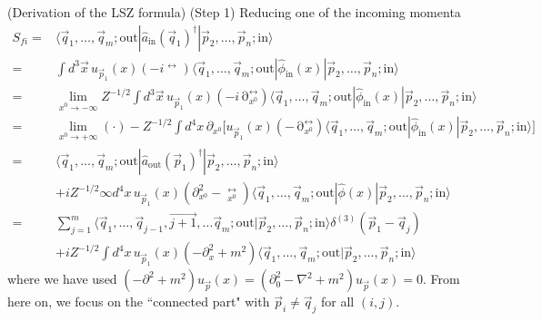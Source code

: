 \begin{thm}
(Derivation of the LSZ formula) (Step 1) Reducing one of the incoming momenta 
\[\begin{align*}
S_{fi}=&\langle \vec{q}_{1},\ldots ,\vec{q}_{m};\mathrm{out}|\hat{a}_{\mathrm{in}}(\vec{q}_{1})^{\dagger }|\vec{p}_{2},\ldots ,\vec{p}_{n};\mathrm{in}\rangle \\
=&\int d^3\vec{x}\,u_{\vec{p}_{1}}(x)(-i\mathop{\partial _{x^{0}}}^{\leftrightarrow })\langle \vec{q}_{1},\ldots ,\vec{q}_{m};\mathrm{out}|\hat{\phi }_{\mathrm{in}}(x)|\vec{p}_{2},\ldots ,\vec{p}_{n};\mathrm{in}\rangle \\
=&\lim _{x^{0}\rightarrow -\infty }Z^{-1/2}\int d^3\vec{x}\,u_{\vec{p}_{1}}(x)(-i\mathop{\partial }^{\leftrightarrow }_{x^{0}})\langle \vec{q}_{1},\ldots ,\vec{q}_{m};\mathrm{out}|\hat{\phi }_{\mathrm{in}}(x)|\vec{p}_{2},\ldots ,\vec{p}_{n};\mathrm{in}\rangle \\
=&\lim _{x^{0}\rightarrow +\infty }(\cdot )-Z^{-1/2}\int d^4x\,\partial _{x^{0}}\Big[u_{\vec{p}_{1}}(x)(-\mathop{\partial }^{\leftrightarrow }_{x^{0}})\langle \vec{q}_{1},\ldots ,\vec{q}_{m};\mathrm{out}|\hat{\phi }_{\mathrm{in}}(x)|\vec{p}_{2},\ldots ,\vec{p}_{n};\mathrm{in}\rangle  \Big]\\
=&\langle \vec{q}_{1},\ldots ,\vec{q}_{m};\mathrm{out}|\hat{a}_{\mathrm{out}}(\vec{p}_{1})^{\dagger }|\vec{p}_{2},\ldots ,\vec{p}_{n};\mathrm{in}\rangle \\
&+iZ^{-1/2}\infty d^{4}x\,u_{\vec{p}_{1}}(x)(\partial ^2_{x^{0}}-\mathop{\partial^2 }^{\leftrightarrow }_{x^{0}})\langle \vec{q}_{1},\ldots ,\vec{q}_{m};\mathrm{out}|\hat{\phi }(x)|\vec{p}_{2},\ldots ,\vec{p}_{n};\mathrm{in}\rangle \\
=&\sum ^{m}_{j=1}\langle \vec{q}_{1},\ldots ,\vec{q}_{j-1},\vec{j+1},\ldots \vec{q}_{m};\mathrm{out}|\vec{p}_{2},\ldots ,\vec{p}_{n};\mathrm{in}\rangle \delta ^{(3)}(\vec{p}_1-\vec{q}_{j})\\
&+iZ^{-1/2}\int d^{4}x\,u_{\vec{p}_{1}}(x)(-\partial _{x}^2+m^2)\langle \vec{q}_{1},\ldots ,\vec{q}_{m};\mathrm{out}|\vec{p}_{2},\ldots ,\vec{p}_{n};\mathrm{in}\rangle
\end{align*}\]
where we have used $(-\partial ^2+m^2)u_{\vec{p}}(x)=(\partial _{0}^2-\nabla ^2+m^2)u_{\vec{p}}(x)=0$. From here on, we focus on the ``connected part" with $\vec{p}_{i}\ne \vec{q}_{j}$ for all $(i,j)$.

\bigskip


\end{thm}
